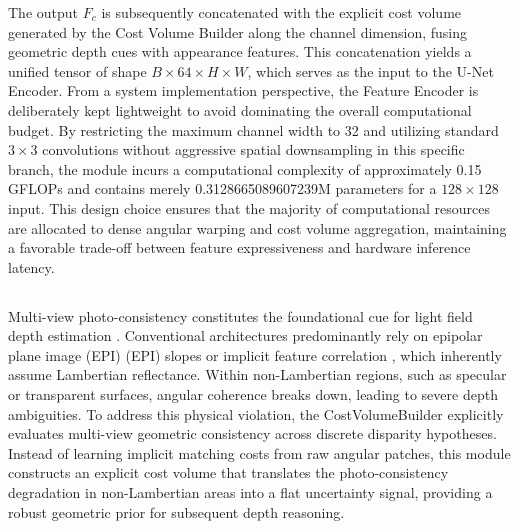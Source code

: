 \documentclass[lettersize,journal]{IEEEtran}
\begin{document}
The output $F_c$ is subsequently concatenated with the explicit cost volume generated by the Cost Volume Builder along the channel dimension, fusing geometric depth cues with appearance features. This concatenation yields a unified tensor of shape $B \times 64 \times H \times W$, which serves as the input to the U-Net Encoder. From a system implementation perspective, the Feature Encoder is deliberately kept lightweight to avoid dominating the overall computational budget. By restricting the maximum channel width to 32 and utilizing standard $3 \times 3$ convolutions without aggressive spatial downsampling in this specific branch, the module incurs a computational complexity of approximately 0.15 GFLOPs and contains merely 0.3128665089607239M parameters for a $128 \times 128$ input. This design choice ensures that the majority of computational resources are allocated to dense angular warping and cost volume aggregation, maintaining a favorable trade-off between feature expressiveness and hardware inference latency.

\subsection{}

Multi-view photo-consistency constitutes the foundational cue for light field depth estimation \cite{wanner2014}. Conventional architectures predominantly rely on epipolar plane image (EPI) (EPI) slopes or implicit feature correlation \cite{heber2018}, which inherently assume Lambertian reflectance. Within non-Lambertian regions, such as specular or transparent surfaces, angular coherence breaks down, leading to severe depth ambiguities. To address this physical violation, the CostVolumeBuilder explicitly evaluates multi-view geometric consistency across discrete disparity hypotheses. Instead of learning implicit matching costs from raw angular patches, this module constructs an explicit cost volume that translates the photo-consistency degradation in non-Lambertian areas into a flat uncertainty signal, providing a robust geometric prior for subsequent depth reasoning.
\end{document}
